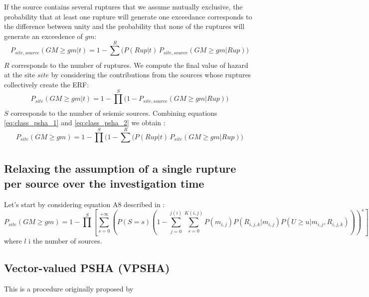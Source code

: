 %

%
If the source contains several ruptures that we assume mutually exclusive, the probability that at least one rupture will generate one exceedance corresponds to the difference between unity and the probability that none of the ruptures will generate an exceedence of $gm$:
\begin{equation}
P_{site,source}(GM\geq gm|t) = 1 - \sum_{}^{R} \Big( P(Rup|t)\,P_{site,source}(GM\geq gm|Rup) \Big)
\label{eq:class_psha_1}
\end{equation}
$R$ corresponds to the number of ruptures. We compute the final value of hazard at the site $site$ by considering the contributions from the sources whose ruptures collectively create the ERF:
%
\begin{equation}
P_{site}(GM \geq gm|t) = 1 - \prod_{}^{S} \Big( 1-P_{site,source}(GM\geq gm|Rup) \Big)
\label{eq:class_psha_2}
\end{equation}
%
$S$ corresponds to the number of seismic sources. Combining equations \ref{eq:class_psha_1} and \ref{eq:class_psha_2} we obtain \cite[][equation 4, page 410]{field2003}:
%
\begin{equation}
P_{site}(GM\geq gm)=1-\prod\limits_{}^{S} 
	\Big( 
		1-\sum_{}^{R} \Big( P(Rup|t)\,P_{site}(GM\geq gm|Rup)
	\Big)
\label{eq:PSHA_calculation}
\end{equation}

\subsection{Relaxing the assumption of a single rupture per source over the investigation time}
%
Let's start by considering equation A8 described in \citet{field2003}:
%
\begin{equation}
P_{site}(GM\geq gm)= 
	1-\prod\limits_{}^{S} 
	\left[\sum\limits_{s=0}^{+\infty}
	\left(P(S=s) 
	\left(
		1-\sum\limits_{j=0}^{j(i)}\sum\limits_{s=0}^{K(i,j)} 
		P(m_{i,j}) 
		P(R_{i,j,k}|m_{i,j}) P(U\geq u|m_{i,j},R_{i,j,k})
	\right)
	\right)^{s}
	\right] 
\end{equation}
where $l$ i the number of sources.

\subsection{Vector-valued PSHA (VPSHA)}
This is a procedure originally proposed by \citet{bazzurro2002}
%
\clearpage\newpage
